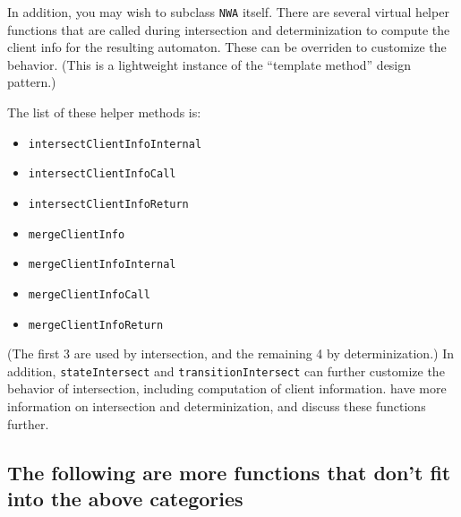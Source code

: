 In addition, you may wish to subclass \texttt{NWA} itself. There are several
virtual helper functions that are called during intersection and
determinization to compute the client info for the resulting automaton. These
can be overriden to customize the behavior. (This is a lightweight instance
of the ``template method'' design pattern.)

The list of these helper methods is:
\begin{itemize}
  \item \texttt{intersectClientInfoInternal}
  \item \texttt{intersectClientInfoCall}
  \item \texttt{intersectClientInfoReturn}
  \item \texttt{mergeClientInfo}
  \item \texttt{mergeClientInfoInternal}
  \item \texttt{mergeClientInfoCall}
  \item \texttt{mergeClientInfoReturn}
\end{itemize}
(The first 3 are used by intersection, and the remaining 4 by
determinization.) In addition, \texttt{stateIntersect} and
\texttt{transitionIntersect} can further customize the behavior of
intersection, including computation of client
information.  have more information on
intersection and determinization, and discuss these functions further.



\subsection{The following are more functions that don't fit into the above categories}

